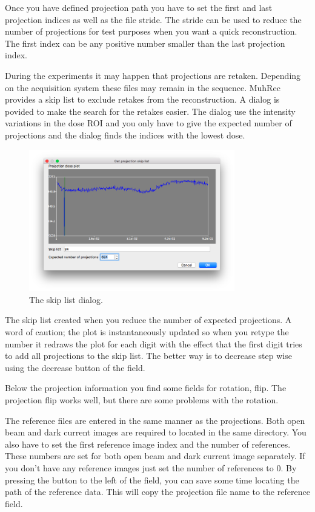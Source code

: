 \documentclass[a4paper]{scrreprt}
\begin{document}
Once you have defined projection path you have to set the first and last projection indices as well as the file stride. The stride can be used to reduce the number of projections for test purposes when you want a quick reconstruction. The first index can be any positive number smaller than the last projection index.

During the experiments it may happen that projections are retaken. Depending on the acquisition system these files may remain in the sequence. MuhRec provides a skip list to exclude retakes from the reconstruction. A dialog is povided to make the search for the retakes easier. The dialog use the intensity variations in the dose ROI and you only have to give the expected number of projections and the dialog finds the indices with the lowest dose. 
\begin{figure}[ht!]
\centering
 \includegraphics[width=0.8\textwidth]{figures3/Dialog_SkipList.png}
\caption{The skip list dialog.}\label{fig_SkipList}
\end{figure}
The skip list created when you reduce the number of expected projections. A word of caution; the plot is instantaneously updated so when you retype the number it redraws the plot for each digit with the effect that the first digit tries to add all projections to the skip list. The better way is to decrease step wise using the decrease button of the field. 

Below the projection information you find some fields for rotation, flip. The projection flip works well, but there are some problems with the rotation.

The reference files are entered in the same manner as the projections. Both open beam and dark current images are required to located in the same directory. You also have to set the first reference image index and the number of references. These numbers are set for both open beam and dark current image separately. If you don't have any reference images just set the number of references to 0. By pressing the button to the left of the field, you can save some time locating the path of the reference data. This will copy the projection file name to the reference field.
\end{document}
